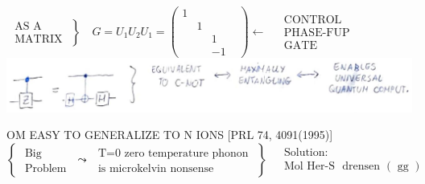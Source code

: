 \documentclass[10pt]{article}
\begin{document}
$\left.\begin{array}{l}\text { AS A } \\ \text { MATRIX }\end{array}\right\} \quad G=U_{1} U_{2} U_{1}=\left(\begin{array}{llll}1 & & & \\ & 1 & & \\ & & 1 & \\ & & -1\end{array}\right) \leftarrow \begin{aligned} & \text { CONTROL } \\ & \text { PHASE-FUP } \\ & \text { GATE }\end{aligned}$\\
\includegraphics[max width=\textwidth, center]{2025_10_16_f28de32ab20bd0ac9bbfg-6}

OM EASY TO GENERALIZE TO N IONS [PRL 74, 4091(1995)]\\
$\left\{\begin{array}{l}\text { Big } \\ \text { Problem }\end{array} \leadsto \begin{array}{l}\text { T=0 zero temperature phonon } \\ \text { is microkelvin nonsense }\end{array}\right\} \begin{aligned} & \text { Solution: } \\ & \text { Mol Her-S } \text { drensen }(\text { gg })\end{aligned}$
\end{document}
